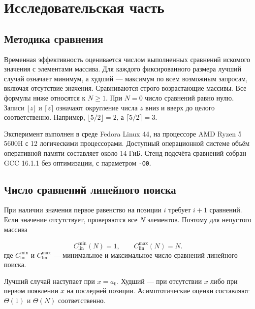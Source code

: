 \chapter{Исследовательская часть}
\section{Методика сравнения}
Временная эффективность оценивается числом выполненных сравнений искомого значения с элементами массива. Для каждого фиксированного размера лучший случай означает минимум, а худший --- максимум по всем возможным запросам, включая отсутствие значения. Сравниваются строго возрастающие массивы. Все формулы ниже относятся к $N\geq1$. При $N=0$ число сравнений равно нулю. Записи $\lfloor z\rfloor$ и $\lceil z\rceil$ означают округление числа $z$ вниз и вверх до целого соответственно. Например, $\lfloor5/2\rfloor=2$, а $\lceil5/2\rceil=3$.

Эксперимент выполнен в среде Fedora Linux 44, на процессоре AMD Ryzen 5 5600H с 12 логическими процессорами. Доступный операционной системе объём оперативной памяти составляет около 14 ГиБ. Стенд подсчёта сравнений собран GCC 16.1.1 без оптимизации, с параметром \texttt{-O0}.

\section{Число сравнений линейного поиска}
При наличии значения первое равенство на позиции $i$ требует $i+1$ сравнений. Если значение отсутствует, проверяются все $N$ элементов. Поэтому для непустого массива
\begin{samepage}
\begin{equation}\label{eq:linear}
 C_{\mathrm{lin}}^{\min}(N)=1,\qquad C_{\mathrm{lin}}^{\max}(N)=N.
\end{equation}
\indent где $C_{\mathrm{lin}}^{\min}$ и $C_{\mathrm{lin}}^{\max}$ --- минимальное и максимальное число сравнений линейного поиска.
\end{samepage}

Лучший случай наступает при $x=a_0$. Худший --- при отсутствии $x$ либо при первом появлении $x$ на последней позиции. Асимптотические оценки составляют $\Theta(1)$ и $\Theta(N)$ соответственно.

